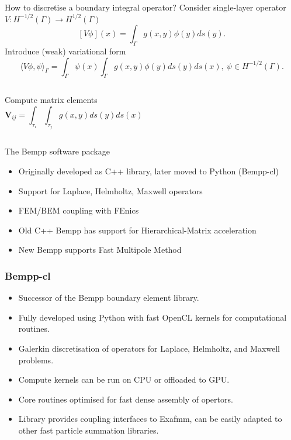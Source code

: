 \documentclass[dvipsnames,10pt]{beamer}
\begin{document}
\begin{frame}{How to discretise a boundary integral operator?}
	Consider single-layer operator $V:H^{-1/2}(\Gamma)\rightarrow H^{1/2}(\Gamma)$
	$$
	[V\phi](x) = \int_{\Gamma}g(x, y)\phi(y)ds(y).
	$$
	Introduce (weak) variational form
	$$
	\langle V\phi, \psi\rangle_{\Gamma} = \int_{\Gamma}\psi(x)\int_{\Gamma}g(x, y)\phi(y)ds(y)ds(x),~\psi\in H^{-1/2}(\Gamma).
	$$
	\begin{columns}[T]
		\begin{tcolorbox}[hbox]
			\begin{column}{0.48\textwidth}
				Compute matrix elements
				$$
				\mathbf{V}_{ij} = \int_{\tau_i}\int_{\tau_j} g(x, y)ds(y) ds(x)
				$$
			\end{column}
		\end{tcolorbox}
		\begin{column}{0.48\textwidth}
			\vspace{-2.5cm}
			\begin{center}
				\scalebox{.15}{}
			\end{center}
		\end{column}
	\end{columns}  
\end{frame}

\begin{frame}{The Bempp software package}
	
	\begin{itemize}
		\item Originally developed as C++ library, later moved to Python (Bempp-cl)
		\item Support for Laplace, Helmholtz, Maxwell operators
		\item FEM/BEM coupling with FEnics
		\item Old C++ Bempp has support for Hierarchical-Matrix acceleration
		\item New Bempp supports Fast Multipole Method
	\end{itemize}

\end{frame}

\begin{frame}
	\frametitle{Bempp-cl}
	\begin{itemize}
		\item Successor of the Bempp boundary element library.
		\item Fully developed using Python with fast OpenCL kernels for computational routines.
		\item Galerkin discretisation of operators for Laplace, Helmholtz, and Maxwell problems.
		\item Compute kernels can be run on CPU or offloaded to GPU.
		\item Core routines optimised for fast dense assembly of opertors.
		\item Library provides coupling interfaces to Exafmm, can be easily adapted to other
		fast particle summation libraries.
	\end{itemize}
\end{frame}
\end{document}

